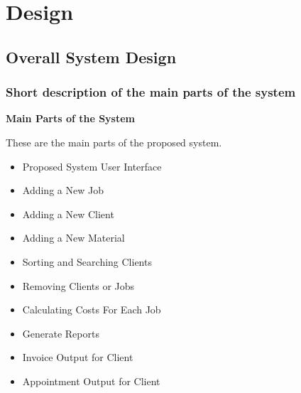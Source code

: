 \chapter{Design}

\section{Overall System Design}

\subsection{Short description of the main parts of the system}

\begin{flushleft}
\textbf{Main Parts of the System}
 \\ \par These are the main parts of the proposed system.
	\begin{itemize}
			\item Proposed System User Interface
			\item Adding a New Job
			\item Adding a New Client
			\item Adding a New Material
			\item Sorting and Searching Clients
			\item Removing Clients or Jobs
			\item Calculating Costs For Each Job
			\item Generate Reports
			\item Invoice Output for Client
			\item Appointment Output for Client
	\end{itemize}

\end{flushleft}


